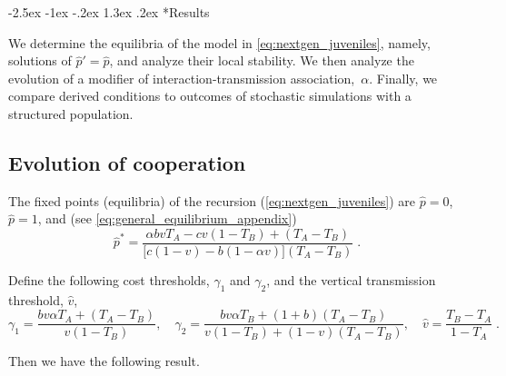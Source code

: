 \documentclass[12pt]{extarticle}
\makeatletter
\renewcommand\section{\@startsection {section}{1}{\z@}%
     {-2.5ex \@plus -1ex \@minus -.2ex}%
     {1.3ex \@plus.2ex}%
    {\Large\bfseries}}
\makeatother
\begin{document}
\section*{Results}

We determine the equilibria of the model in \autoref{eq:nextgen_juveniles}, namely, solutions of $\hat{p}' = \hat{p}$, and analyze their local stability.
We then analyze the evolution of a modifier of interaction-transmission association,~$\alpha$.
Finally, we compare derived conditions to outcomes of stochastic simulations with a structured population.

\subsection*{Evolution of cooperation}

The fixed points (equilibria) of  the recursion (\autoref{eq:nextgen_juveniles}) are $\hat p=0$, $\hat p=1$, and (see \autoref{eq:general_equilibrium_appendix})
\begin{equation} \label{eq:general_equilibrium}
  \hat{p}^* =  
  \frac{\alpha bvT_A - cv(1-T_B) + (T_A-T_B)}{\big[c(1-v) - b (1-\alpha v)\big] (T_A-T_B)} \;.
\end{equation}

Define the following cost thresholds, $\gamma_1$ and $\gamma_2$, and the vertical transmission threshold, $\hat v$,
\begin{equation} \label{eq:cost_thresholds_v_threshold} 
\gamma_1 = \frac{b v \alpha T_A + (T_A - T_B)}{v(1-T_B)}, \quad
\gamma_2 = \frac{b v \alpha T_B + (1+b) (T_A - T_B)}{v(1-T_B) + (1-v)(T_A-T_B)}, \quad
\hat v = \frac{T_B - T_A}{1-T_A} \;.
\end{equation}

Then we have the following result.
\\
\end{document}
